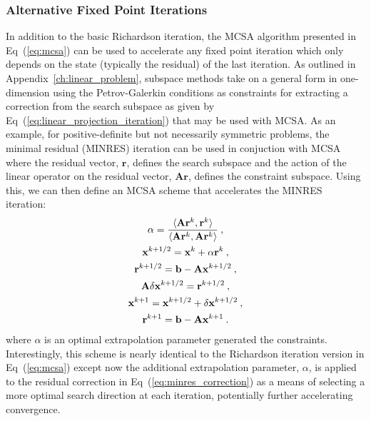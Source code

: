 \subsubsection{Alternative Fixed Point Iterations}
\label{subsubsec:alternative_fixed_point}
In addition to the basic Richardson iteration, the MCSA algorithm
presented in Eq~(\ref{eq:mcsa}) can be used to accelerate any fixed
point iteration which only depends on the state (typically the
residual) of the last iteration. As outlined in
Appendix~\ref{ch:linear_problem}, subspace methods take on a general
form in one-dimension using the Petrov-Galerkin conditions as
constraints for extracting a correction from the search subspace as
given by Eq~(\ref{eq:linear_projection_iteration}) that may be used
with MCSA. As an example, for positive-definite but not necessarily
symmetric problems, the minimal residual (MINRES) iteration
\citep{saad_iterative_2003} can be used in conjuction with MCSA where
the residual vector, $\mathbf{r}$, defines the search subspace and the
action of the linear operator on the residual vector,
$\mathbf{A}\mathbf{r}$, defines the constraint subspace. Using this,
we can then define an MCSA scheme that accelerates the MINRES
iteration:
\begin{subequations}
  \begin{gather}
    \alpha = \frac{\langle \mathbf{A}\mathbf{r}^k, \mathbf{r}^k
      \rangle}{\langle \mathbf{A}\mathbf{r}^k, \mathbf{A}\mathbf{r}^k
      \rangle}\:, \\
    \mathbf{x}^{k+1/2} = \mathbf{x}^k + \alpha \mathbf{r}^k\:,
    \label{eq:minres_correction}\\
    \mathbf{r}^{k+1/2} = \mathbf{b} - \mathbf{A}\mathbf{x}^{k+1/2}\:,\\ 
    \mathbf{A}\delta\mathbf{x}^{k+1/2} = \mathbf{r}^{k+1/2}\:,\\ 
    \mathbf{x}^{k+1} = \mathbf{x}^{k+1/2} + \delta\mathbf{x}^{k+1/2}\:,\\ 
    \mathbf{r}^{k+1} = \mathbf{b} - \mathbf{A}\mathbf{x}^{k+1}\:.
  \end{gather}
  \label{eq:mcsa_minres}
\end{subequations}
where $\alpha$ is an optimal extrapolation parameter generated the
constraints. Interestingly, this scheme is nearly identical to the
Richardson iteration version in Eq~(\ref{eq:mcsa}) except now the
additional extrapolation parameter, $\alpha$, is applied to the
residual correction in Eq~(\ref{eq:minres_correction}) as a means of
selecting a more optimal search direction at each iteration,
potentially further accelerating convergence.

